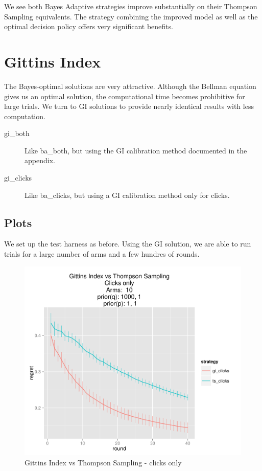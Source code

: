 \documentclass[11pt,a4,singlespacing,titlepagenumber=on]{scrreprt}
\numberwithin{equation}{chapter} %
\theoremstyle{remark}
\begin{document}
We see both Bayes Adaptive strategies improve substantially on their Thompson Sampling equivalents. The strategy combining the improved model as well as the optimal decision policy offers very significant benefits.


\section{Gittins Index}

The Bayes-optimal solutions are very attractive. Although the Bellman equation gives us an optimal solution, the computational time becomes prohibitive for large trials. We turn to GI solutions to provide nearly identical results with less computation.

\begin{description}
	\item[gi\_both] Like ba\_both, but using the GI calibration method documented in the appendix.
	\item[gi\_clicks] Like ba\_clicks, but using a GI calibration method only for clicks.
\end{description}



\subsection{Plots}

We set up the test harness as before. Using the GI solution, we are able to run trials for a large number of arms and a few hundres of rounds.

\begin{figure}[H]
    \centering
    \includegraphics[scale=0.7]{GIvsTS.pdf}
    \caption{ Gittins Index vs Thompson Sampling - clicks only }
\end{figure}
\end{document}
